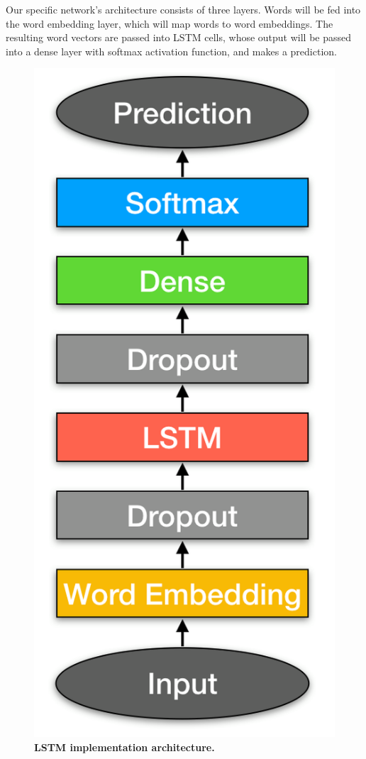 \documentclass{sig-alternate-05-2015}
\begin{document}
	Our specific network's architecture consists of three layers. Words will be fed into the word embedding layer, which will map words to word embeddings. The resulting word vectors are passed into LSTM cells, whose output will be passed into a dense layer with softmax activation function, and makes a prediction.
	\begin{figure}[H]
		\centering\includegraphics[scale=0.3]{architecture} 
		\caption{\textbf{ LSTM implementation architecture.}}
	\end{figure}
	
\end{document}
